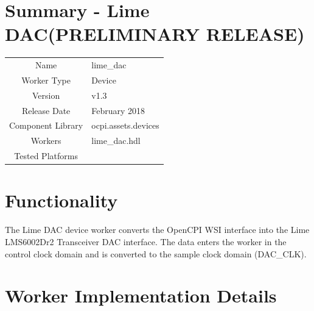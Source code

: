 \documentclass{article}
\author{} %
\date{Version \docVersion} %
\title{\docTitle}
\def\docVersion{1.3}
\def\comp{lime\_dac}
\def\Comp{Lime DAC}
\begin{document}
\section*{Summary - \Comp (PRELIMINARY RELEASE)}
\begin{tabular}{|c|M{13.5cm}|}
	\hline
	                  &                  \\
	\hline
	Name              & \comp            \\
	\hline
	Worker Type       & Device           \\
	\hline
	Version           & v\docVersion \\
	\hline
	Release Date      & February 2018 \\
	\hline
	Component Library & ocpi.assets.devices     \\
	\hline
	Workers           & \comp.hdl        \\
	\hline
	Tested Platforms  & \\
	\hline
\end{tabular}

\section*{Functionality}
\begin{flushleft}
	The Lime DAC device worker converts the OpenCPI WSI interface into the Lime LMS6002Dr2 Transceiver DAC interface. The data enters the worker in the control clock domain and is converted to the sample clock domain (DAC\_CLK).
\end{flushleft}

\section*{Worker Implementation Details}
\end{document}
